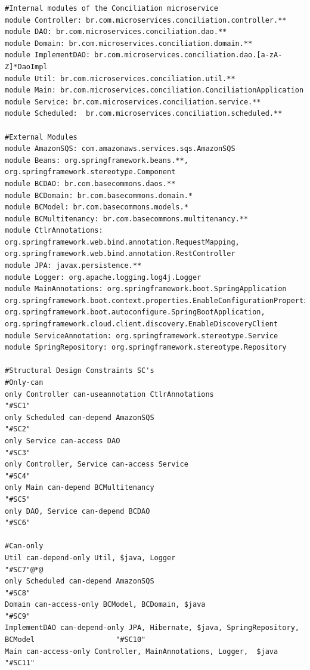 \documentclass[12pt]{article}
\begin{document}
\begin{lstlisting}[style=colorido, caption={\textcolor{blue}{Conciliation microservice's architectural project specification.}},label={list:especArquiteturalConciliation}
]
#Internal modules of the Conciliation microservice
module Controller: br.com.microservices.conciliation.controller.**
module DAO: br.com.microservices.conciliation.dao.**
module Domain: br.com.microservices.conciliation.domain.**
module ImplementDAO: br.com.microservices.conciliation.dao.[a-zA-Z]*DaoImpl
module Util: br.com.microservices.conciliation.util.**
module Main: br.com.microservices.conciliation.ConciliationApplication
module Service: br.com.microservices.conciliation.service.**
module Scheduled:  br.com.microservices.conciliation.scheduled.**

#External Modules
module AmazonSQS: com.amazonaws.services.sqs.AmazonSQS
module Beans: org.springframework.beans.**, org.springframework.stereotype.Component
module BCDAO: br.com.basecommons.daos.**
module BCDomain: br.com.basecommons.domain.*
module BCModel: br.com.basecommons.models.*
module BCMultitenancy: br.com.basecommons.multitenancy.**
module CtlrAnnotations: org.springframework.web.bind.annotation.RequestMapping, org.springframework.web.bind.annotation.RestController
module JPA: javax.persistence.**
module Logger: org.apache.logging.log4j.Logger
module MainAnnotations: org.springframework.boot.SpringApplication org.springframework.boot.context.properties.EnableConfigurationProperties, org.springframework.boot.autoconfigure.SpringBootApplication, org.springframework.cloud.client.discovery.EnableDiscoveryClient
module ServiceAnnotation: org.springframework.stereotype.Service
module SpringRepository: org.springframework.stereotype.Repository

#Structural Design Constraints SC's
#Only-can
only Controller can-useannotation CtlrAnnotations																																	"#SC1"
only Scheduled can-depend AmazonSQS																																															"#SC2"
only Service can-access DAO																																																							"#SC3"
only Controller, Service can-access Service																																							"#SC4"
only Main can-depend BCMultitenancy																																															"#SC5"
only DAO, Service can-depend BCDAO																																																"#SC6"
	
#Can-only
Util can-depend-only Util, $java, Logger																																										"#SC7"@*@
only Scheduled can-depend AmazonSQS																																															"#SC8"
Domain can-access-only BCModel, BCDomain, $java																																			"#SC9"
ImplementDAO can-depend-only JPA, Hibernate, $java, SpringRepository, BCModel					"#SC10"
Main can-access-only Controller, MainAnnotations, Logger,  $java																			"#SC11"


\end{lstlisting}
\end{document}
